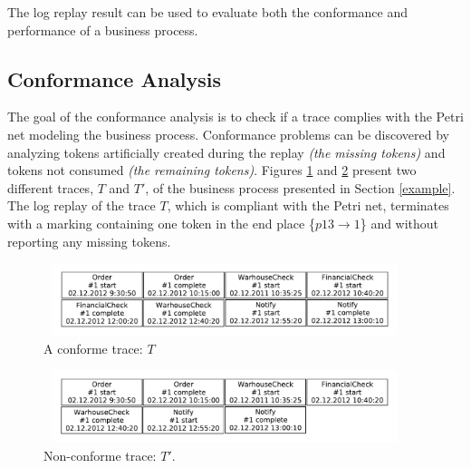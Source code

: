 \documentclass{llncs}
\begin{document}
The log replay result can be used to evaluate both the conformance and performance of a business process. 

\subsection{Conformance Analysis}\label{ConformanceAnalysis}
The goal of the conformance analysis is to check if a trace complies with the Petri net modeling the business process. Conformance problems can be discovered by analyzing tokens artificially created during the replay {\itshape (the missing tokens)} and tokens not consumed {\itshape (the remaining tokens)}. Figures \ref{ConfLog} and \ref{NonConfLog} present two different traces, $T$ and $T'$, of the business process presented in Section \ref{example}. The log replay of the trace $T$, which is compliant with the Petri net, terminates with a marking containing one token in the end place \{${p13 \rightarrow 1}$\} and without reporting any missing tokens.

\begin{figure}[h]
\centering
\includegraphics[width=300pt,height=60pt]
{./items/logConforme.pdf}
\caption{A conforme trace: $T$}
\label{ConfLog}
\end{figure}

\begin{figure}[h]
\centering
\includegraphics[width=300pt,height=60pt]
{./items/logNonConforme.pdf}
\caption{Non-conforme trace: $T'$.}
\label{NonConfLog}
\end{figure}
\end{document}
